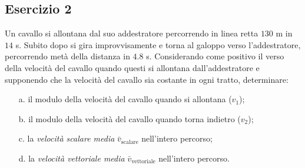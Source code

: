 \documentclass[12pt,a4paper]{book}
\begin{document}
\subsection*{Esercizio 2}
Un cavallo si allontana dal suo addestratore percorrendo in linea retta $130$ m in $14$ s. Subito dopo si gira improvvisamente e torna al galoppo verso l'addestratore, percorrendo metà della distanza in $4.8$ s. Considerando come positivo il verso della velocità del cavallo quando questi si allontana dall'addestratore
e supponendo che la velocità del cavallo sia costante in ogni tratto, determinare:
\begin{enumerate}
\item[a.]{il modulo della velocità del cavallo quando si allontana ($v_1$);}
\item[b.]{il modulo della velocità del cavallo quando torna indietro ($v_2$);}
\item[c.]{la \textit{velocità scalare media} $\bar{v}_{\text{scalare}}$ nell'intero percorso;}
\item[d.]{la \textit{velocità vettoriale media} $\bar{v}_{\text{vettoriale}}$ nell’intero percorso.}
\end{enumerate}
\end{document}
